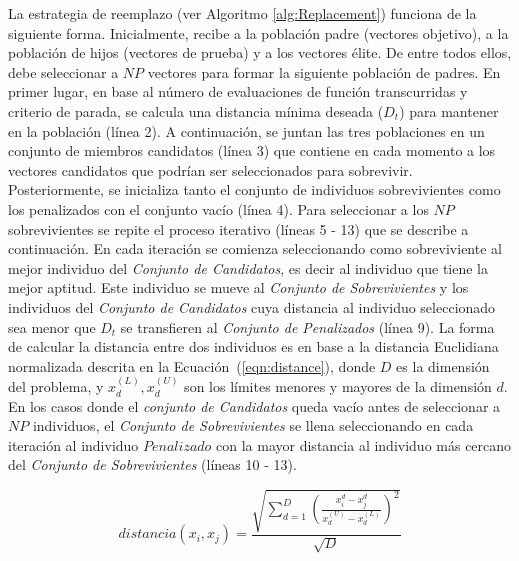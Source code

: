 La estrategia de reemplazo (ver Algoritmo \ref{alg:Replacement}) funciona de la siguiente forma.
%
Inicialmente, recibe a la población padre (vectores objetivo), a la población de hijos (vectores de prueba) y a los vectores élite.
%
De entre todos ellos, debe seleccionar a $NP$ vectores para formar la siguiente población de padres.
%
En primer lugar, en base al número de evaluaciones de función transcurridas y criterio de parada, se calcula una distancia mínima deseada ($D_t$) para mantener 
en la población (línea 2).
%
A continuación, se juntan las tres poblaciones en un conjunto de miembros candidatos (línea 3) que contiene en cada momento a los vectores candidatos 
que podrían ser seleccionados para sobrevivir.
%
Posteriormente, se inicializa tanto el conjunto de individuos sobrevivientes como los penalizados con el conjunto vacío (línea 4).
%
Para seleccionar a los $NP$ sobrevivientes se repite el proceso iterativo (líneas 5 - 13) que se describe a continuación.
%
En cada iteración se comienza seleccionando como sobreviviente al mejor individuo del \textit{Conjunto de Candidatos}, es decir al individuo que tiene la mejor aptitud.
%
Este individuo se mueve al \textit{Conjunto de Sobrevivientes} y los individuos del \textit{Conjunto de Candidatos} cuya distancia al individuo seleccionado sea menor 
que $D_t$ se transfieren al \textit{Conjunto de Penalizados} (línea 9).
%
La forma de calcular la distancia entre dos individuos es en base a la distancia Euclidiana normalizada descrita en la Ecuación~(\ref{eqn:distance}), 
donde $D$ es la dimensión del problema, y $x_d^{(L)}, x_d^{(U)}$ son los límites menores y mayores de la dimensión $d$.
%
En los casos donde el \textit{conjunto de Candidatos} queda vacío antes de seleccionar a $NP$ individuos, 
el \textit{Conjunto de Sobrevivientes} se llena seleccionando en cada iteración al individuo $Penalizado$ con la mayor distancia al individuo más cercano 
del \textit{Conjunto de Sobrevivientes} (líneas 10 - 13).

\begin{equation}\label{eqn:distance}
distancia ( x_{i}, x_j ) = \frac{\sqrt{ \sum_{d=1}^D \left ( \frac{x_{i}^d - x_j^d}{x_d^{(U)} - x_d^{(L)}} \right )^2  }} {\sqrt{D}}
\end{equation}


